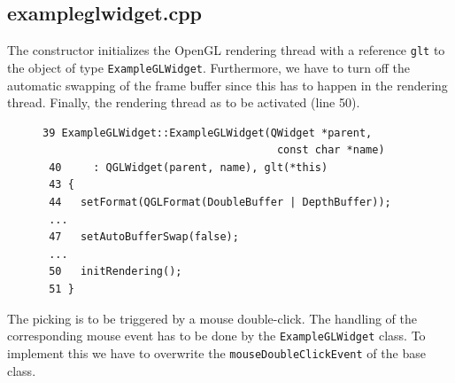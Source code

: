 \documentclass[jou,noapacite]{apa}
\begin{document}
\subsection{exampleglwidget.cpp}

The constructor initializes the OpenGL rendering thread with a
reference \lstinline|glt| to the object of type \lstinline|ExampleGLWidget|.
%
Furthermore, we have to turn off the automatic swapping of the frame buffer
since this has to happen in the rendering thread. Finally, the rendering thread
as to be activated (line 50).
%
\begin{figure}[h]
\begin{lstlisting}[basicstyle=\scriptsize]
 39 ExampleGLWidget::ExampleGLWidget(QWidget *parent,
                                     const char *name)
 40     : QGLWidget(parent, name), glt(*this)
 43 {
 44   setFormat(QGLFormat(DoubleBuffer | DepthBuffer));
 ...
 47   setAutoBufferSwap(false);
 ...
 50   initRendering();
 51 }
\end{lstlisting}
\end{figure}
The picking is to be triggered by a mouse double-click.
%
The handling of the corresponding mouse event has to be done by
the \lstinline|ExampleGLWidget| class.
%
To implement this we have to overwrite the \lstinline|mouseDoubleClickEvent| of
the base class.
\end{document}
